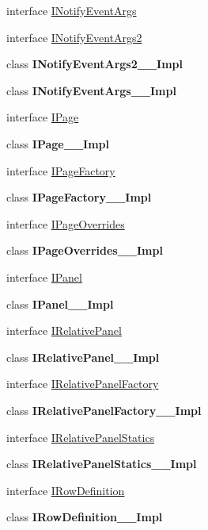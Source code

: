 \begin{DoxyCompactItemize}
interface \hyperlink{interface_windows_1_1_u_i_1_1_xaml_1_1_controls_1_1_i_notify_event_args}{I\+Notify\+Event\+Args}
\item 
interface \hyperlink{interface_windows_1_1_u_i_1_1_xaml_1_1_controls_1_1_i_notify_event_args2}{I\+Notify\+Event\+Args2}
\item 
class {\bfseries I\+Notify\+Event\+Args2\+\_\+\+\_\+\+Impl}
\item 
class {\bfseries I\+Notify\+Event\+Args\+\_\+\+\_\+\+Impl}
\item 
interface \hyperlink{interface_windows_1_1_u_i_1_1_xaml_1_1_controls_1_1_i_page}{I\+Page}
\item 
class {\bfseries I\+Page\+\_\+\+\_\+\+Impl}
\item 
interface \hyperlink{interface_windows_1_1_u_i_1_1_xaml_1_1_controls_1_1_i_page_factory}{I\+Page\+Factory}
\item 
class {\bfseries I\+Page\+Factory\+\_\+\+\_\+\+Impl}
\item 
interface \hyperlink{interface_windows_1_1_u_i_1_1_xaml_1_1_controls_1_1_i_page_overrides}{I\+Page\+Overrides}
\item 
class {\bfseries I\+Page\+Overrides\+\_\+\+\_\+\+Impl}
\item 
interface \hyperlink{interface_windows_1_1_u_i_1_1_xaml_1_1_controls_1_1_i_panel}{I\+Panel}
\item 
class {\bfseries I\+Panel\+\_\+\+\_\+\+Impl}
\item 
interface \hyperlink{interface_windows_1_1_u_i_1_1_xaml_1_1_controls_1_1_i_relative_panel}{I\+Relative\+Panel}
\item 
class {\bfseries I\+Relative\+Panel\+\_\+\+\_\+\+Impl}
\item 
interface \hyperlink{interface_windows_1_1_u_i_1_1_xaml_1_1_controls_1_1_i_relative_panel_factory}{I\+Relative\+Panel\+Factory}
\item 
class {\bfseries I\+Relative\+Panel\+Factory\+\_\+\+\_\+\+Impl}
\item 
interface \hyperlink{interface_windows_1_1_u_i_1_1_xaml_1_1_controls_1_1_i_relative_panel_statics}{I\+Relative\+Panel\+Statics}
\item 
class {\bfseries I\+Relative\+Panel\+Statics\+\_\+\+\_\+\+Impl}
\item 
interface \hyperlink{interface_windows_1_1_u_i_1_1_xaml_1_1_controls_1_1_i_row_definition}{I\+Row\+Definition}
\item 
class {\bfseries I\+Row\+Definition\+\_\+\+\_\+\+Impl}
\item 

\end{DoxyCompactItemize}
